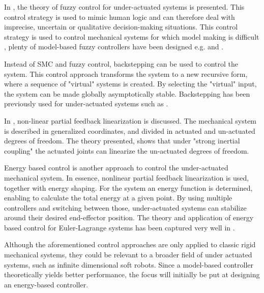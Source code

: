In \cite{liu2013survey}, the theory of fuzzy control for under-actuated systems is presented. This control strategy is used to mimic human logic and can therefore deal with imprecise, uncertain or qualitative decision-making situations. This control strategy is used to control mechanical systems for which model making is difficult \cite{michels2007fuzzy}, plenty of model-based fuzzy controllers have been designed e.g. \cite{begovich2002takagi} and \cite{tao2008design}. 

Instead of SMC and fuzzy control, backstepping \cite{khalil2002nonlinear} can be used to control the system. This control approach transforms the system to a new recursive form, where a sequence of "virtual" systems is created. By selecting the "virtual" input, the system can be made globally asymptotically stable. Backstepping has been previously used for under-actuated systems such as \cite{madani2006backstepping}.

In \cite{spong1994linear}, non-linear partial feedback linearization is discussed. The mechanical system is described in generalized coordinates, and divided in actuated and un-actuated degrees of freedom. The theory presented, shows that under "strong inertial coupling" the actuated joints can linearize the un-actuated degrees of freedom. 

Energy based control \cite{spong1996energy} is another approach to control the under-actuated mechanical system. In essence, nonlinear partial feedback linearization is used, together with energy shaping. For the system an energy function is determined, enabling to calculate the total energy at a given point. By using multiple controllers and switching between those, under-actuated systems can stabilize around their desired end-effector position. The theory and application of energy based control for Euler-Lagrange systems has been captured very well in \cite{ortega2013passivity}.


Although the aforementioned control approaches are only applied to classic rigid mechanical systems, they could be relevant to a broader field of under actuated systems, such as infinite dimensional soft robots. Since a model-based controller theoretically yields better performance, the focus will initially be put at designing an energy-based controller.



